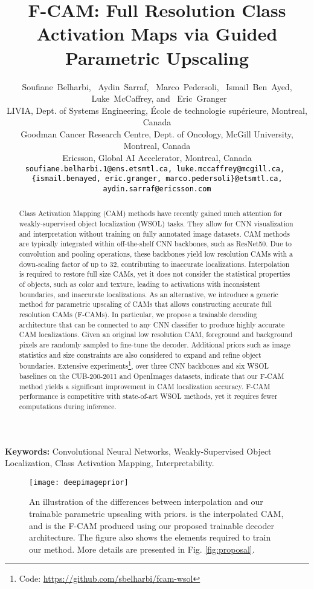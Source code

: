 \documentclass[twocolumn]{article}
\title{F-CAM: Full Resolution Class Activation Maps  via Guided Parametric Upscaling}
\author{Soufiane~Belharbi,
  ~Aydin~Sarraf,
  ~Marco~Pedersoli,
  ~Ismail~Ben~Ayed,
  ~Luke~McCaffrey, and
  ~Eric~Granger\\
 LIVIA, Dept. of Systems Engineering, École de technologie supérieure, Montreal, Canada \\
	 Goodman Cancer Research Centre, Dept. of Oncology, McGill University, Montreal, Canada\\
   Ericsson,  Global AI Accelerator, Montreal, Canada\\
{\tt\footnotesize \textcolor{black}{soufiane.belharbi.1@ens.etsmtl.ca, luke.mccaffrey@mcgill.ca}, }\\
{\tt\footnotesize \textcolor{black}{\{ismail.benayed, eric.granger, marco.pedersoli\}@etsmtl.ca}, {\tt\footnotesize \textcolor{black}{aydin.sarraf@ericsson.com}}}
}
\theoremstyle{definition}
\begin{document}
\maketitle\thispagestyle{fancy}

\maketitle


\begin{abstract}
  Class Activation Mapping (CAM) methods have recently gained much attention for weakly-supervised object localization (WSOL) tasks. They allow for CNN visualization and interpretation without training on fully annotated image datasets. CAM methods are typically integrated within off-the-shelf CNN backbones, such as ResNet50. Due to convolution and pooling operations, these backbones yield low resolution CAMs with a down-scaling factor of up to 32, contributing to inaccurate localizations. Interpolation is required to restore full size CAMs, yet it does not consider the statistical properties of objects, such as color and texture, leading to activations with inconsistent boundaries, and inaccurate localizations.
As an alternative, we introduce a generic method for parametric upscaling of CAMs that allows constructing accurate full resolution CAMs (F-CAMs). In particular, we propose a trainable decoding architecture that can be connected to any CNN classifier to produce highly accurate CAM localizations. Given an original low resolution CAM, foreground and background pixels are randomly sampled to fine-tune the decoder. Additional priors such as image statistics and size constraints are also considered to expand and refine object boundaries.
Extensive experiments\footnote{{\small Code: \textcolor{red}{ \href{https://github.com/sbelharbi/fcam-wsol}{https://github.com/sbelharbi/fcam-wsol}}}}, over three CNN backbones and six WSOL baselines on the CUB-200-2011 and OpenImages datasets, indicate that our F-CAM method yields a significant improvement in CAM localization accuracy. F-CAM performance is competitive with state-of-art WSOL methods, yet it requires fewer computations during inference.
\end{abstract}

\textbf{Keywords:} Convolutional Neural Networks, Weakly-Supervised Object Localization, Class Activation Mapping, Interpretability.



\begin{figure}[ht!]
\centering
  \centering
  \texttt{[image: deepimageprior]}
  \caption{An illustration of the differences between interpolation and our trainable parametric upscaling with priors.  is the interpolated CAM, and  is the F-CAM produced using our proposed trainable decoder architecture. The figure also shows the elements required to train our method. More details are presented in Fig. \ref{fig:proposal}.}
  \label{fig:intuition}
\end{figure}
\end{document}
